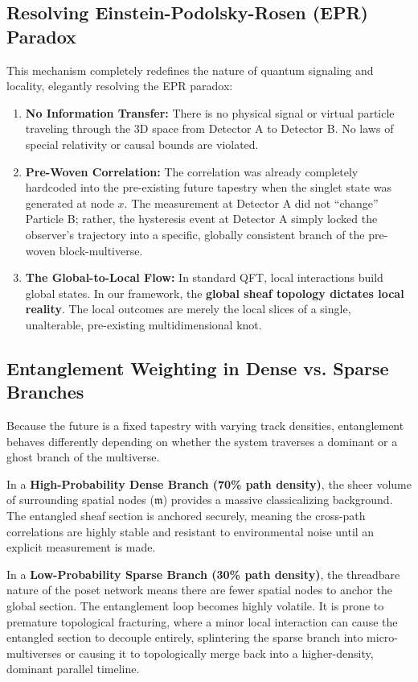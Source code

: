 \documentclass[12pt,letterpaper]{article}
\begin{document}
\subsection{Resolving Einstein-Podolsky-Rosen (EPR) Paradox}
This mechanism completely redefines the nature of quantum signaling and locality, elegantly resolving the EPR paradox:
\begin{enumerate}
    \item \textbf{No Information Transfer:} There is no physical signal or virtual particle traveling through the 3D space from Detector A to Detector B. No laws of special relativity or causal bounds are violated.
    \item \textbf{Pre-Woven Correlation:} The correlation was already completely hardcoded into the pre-existing future tapestry when the singlet state was generated at node $x$. The measurement at Detector A did not ``change'' Particle B; rather, the hysteresis event at Detector A simply locked the observer's trajectory into a specific, globally consistent branch of the pre-woven block-multiverse.
    \item \textbf{The Global-to-Local Flow:} In standard QFT, local interactions build global states. In our framework, the \textbf{global sheaf topology dictates local reality}. The local outcomes are merely the local slices of a single, unalterable, pre-existing multidimensional knot.
\end{enumerate}

\subsection{Entanglement Weighting in Dense vs. Sparse Branches}
Because the future is a fixed tapestry with varying track densities, entanglement behaves differently depending on whether the system traverses a dominant or a ghost branch of the multiverse.

In a \textbf{High-Probability Dense Branch (70\% path density)}, the sheer volume of surrounding spatial nodes ($\mathfrak{m}$) provides a massive classicalizing background. The entangled sheaf section is anchored securely, meaning the cross-path correlations are highly stable and resistant to environmental noise until an explicit measurement is made.

In a \textbf{Low-Probability Sparse Branch (30\% path density)}, the threadbare nature of the poset network means there are fewer spatial nodes to anchor the global section. The entanglement loop becomes highly volatile. It is prone to premature topological fracturing, where a minor local interaction can cause the entangled section to decouple entirely, splintering the sparse branch into micro-multiverses or causing it to topologically merge back into a higher-density, dominant parallel timeline.
\end{document}
